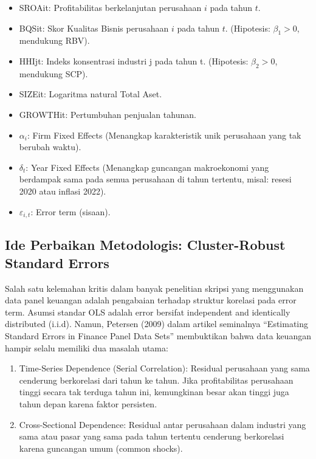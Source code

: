 \documentclass[12pt,a4paper]{report}
\providecommand{\tightlist}{%
  \setlength{\itemsep}{0pt}\setlength{\parskip}{0pt}%
}
\begin{document}
\begin{itemize}
\tightlist
\item
  SROAit: Profitabilitas berkelanjutan perusahaan \(i\) pada tahun
  \(t\).
\item
  BQSit: Skor Kualitas Bisnis perusahaan \(i\) pada tahun \(t\).
  (Hipotesis: \(\beta_1>0\), mendukung RBV).
\item
  HHIjt: Indeks konsentrasi industri j pada tahun t. (Hipotesis:
  \(\beta_2>0\), mendukung SCP).
\item
  SIZEit: Logaritma natural Total Aset.
\item
  GROWTHit: Pertumbuhan penjualan tahunan.
\item
  \(\alpha_i\): Firm Fixed Effects (Menangkap karakteristik unik
  perusahaan yang tak berubah waktu).
\item
  \(\delta_t\): Year Fixed Effects (Menangkap guncangan makroekonomi
  yang berdampak sama pada semua perusahaan di tahun tertentu, misal:
  resesi 2020 atau inflasi 2022).
\item
  \(\varepsilon_{i,t}\): Error term (sisaan).
\end{itemize}

\hypertarget{ide-perbaikan-metodologis-cluster-robust-standard-errors}{%
\subsection{Ide Perbaikan Metodologis: Cluster-Robust Standard
Errors}\label{ide-perbaikan-metodologis-cluster-robust-standard-errors}}

Salah satu kelemahan kritis dalam banyak penelitian skripsi yang
menggunakan data panel keuangan adalah pengabaian terhadap struktur
korelasi pada error term. Asumsi standar OLS adalah error bersifat
independent and identically distributed (i.i.d). Namun, Petersen (2009)
dalam artikel seminalnya ``Estimating Standard Errors in Finance Panel
Data Sets'' membuktikan bahwa data keuangan hampir selalu memiliki dua
masalah utama:

\begin{enumerate}
\def\labelenumi{\arabic{enumi}.}
\tightlist
\item
  Time-Series Dependence (Serial Correlation): Residual perusahaan yang
  sama cenderung berkorelasi dari tahun ke tahun. Jika profitabilitas
  perusahaan tinggi secara tak terduga tahun ini, kemungkinan besar akan
  tinggi juga tahun depan karena faktor persisten.
\item
  Cross-Sectional Dependence: Residual antar perusahaan dalam industri
  yang sama atau pasar yang sama pada tahun tertentu cenderung
  berkorelasi karena guncangan umum (common shocks).
\end{enumerate}
\end{document}
